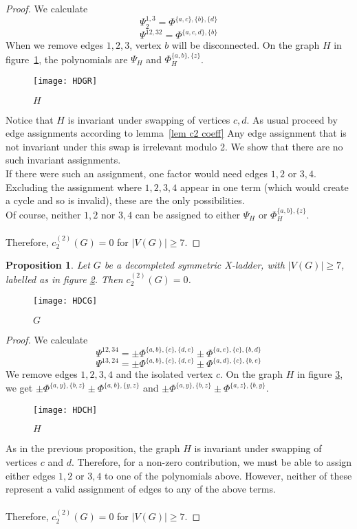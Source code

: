 \documentclass[12pt]{amsart}
\newtheorem{proposition}[definition]{Proposition}
\numberwithin{definition}{section}
\begin{document}
\begin{proof} We calculate 
	\[\Psi_2^{1,3}=\Phi^{\{a,c\},\{b\},\{d\}}\]
	\[\Psi^{12,32}=\Phi^{\{a,c,d\},\{b\}}\]
	When we remove edges $1,2,3$, vertex $b$ will be disconnected. On the graph $H$ in figure~\ref{fig anti H}, the polynomials are $\Psi_H$ and $\Phi_H^{\{a,b\},\{z\}}$. \\
	\begin{figure}[h]
		\texttt{[image: HDGR]}
		\caption{$H$}\label{fig anti H}
	\end{figure} 
	Notice that $H$ is invariant under swapping of vertices $c,d$.  As usual proceed by edge assignments according to lemma~\ref{lem c2 coeff} Any edge assignment that is not invariant under this swap is irrelevant modulo 2. We show that there are no such invariant assignments. \\
	If there were such an assignment, one factor would need edges $1,2$ or $3,4$. Excluding the assignment where $1,2,3,4$ appear in one term (which would create a cycle and so is invalid), these are the only possibilities. \\
	Of course, neither $1,2$ nor $3,4$ can be assigned to either $\Psi_H$ or $\Phi_H^{\{a,b\},\{z\}} $. \\ \\
	Therefore, $c_2^{(2)}(G)=0$ for $|V(G)|\geq7$.  
\end{proof}

\begin{proposition}
	Let $G$ be a decompleted symmetric X-ladder, with $|V(G)|\geq 7$, labelled as in figure \ref{fig sym X}. Then $c_2^{(2)}(G)=0$. \\
\end{proposition}
\begin{figure}[h]
	\texttt{[image: HDCG]}
	\caption{$G$}\label{fig sym X}
\end{figure}
\begin{proof}
We calculate 
\[\Psi^{12,34}=\pm\Phi^{\{a,b\},\{c\},\{d,e\}}\pm\Phi^{\{a,e\},\{c\},\{b,d\}}\]
\[\Psi^{13,24}=\pm\Phi^{\{a,b\},\{c\},\{d,e\}}\pm\Phi^{\{a,d\},\{c\},\{b,e\}}\]
We remove edges $1,2,3,4$ and the isolated vertex $c$. On the graph $H$ in figure \ref{fig sym H}, we get $\pm\Phi^{\{a,y\},\{b,z\}}\pm\Phi^{\{a,b\},\{y,z\}}$ and $\pm\Phi^{\{a,y\},\{b,z\}}\pm\Phi^{\{a,z\},\{b,y\}}$. \\
\begin{figure}[h]
	\texttt{[image: HDCH]}
	\caption{$H$}\label{fig sym H}
\end{figure}
As in the previous proposition, the graph $H$ is invariant under swapping of vertices $c$ and $d$. Therefore, for a non-zero contribution, we must be able to assign either edges $1,2$ or $3,4$ to one of the polynomials above. However, neither of these represent a valid assignment of edges to any of the above terms. \\ \\
Therefore, $c_2^{(2)}(G)=0$ for $|V(G)|\geq 7$. 
\end{proof}
\end{document}
